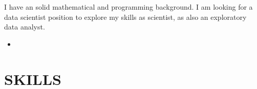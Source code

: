 \documentclass[12pt,a4paper,roman]{moderncv}        %
\begin{document}
\vspace{6pt}
I have an solid mathematical and programming background. I am looking for a data scientist position to explore my skills as scientist, as also an exploratory data analyst. 
\begin{itemize}
\item {}

\vspace{6pt}
%
%
%

\end{itemize}


\section{SKILLS}
\end{document}
